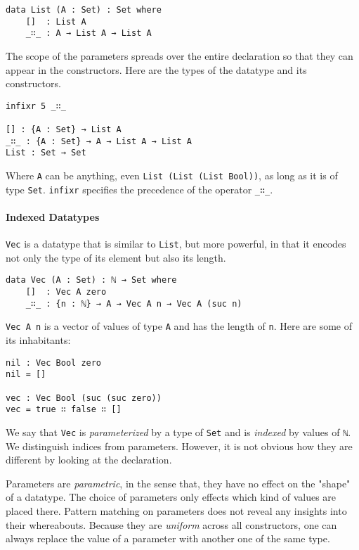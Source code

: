 \documentclass[../thesis.tex]{subfiles}
\begin{document}
\begin{lstlisting}
data List (A : Set) : Set where
    []  : List A
    _∷_ : A → List A → List A
\end{lstlisting}

The scope of the parameters spreads over the entire declaration so that they can
appear in the constructors.
Here are the types of the datatype and its constructors.

\begin{lstlisting}
infixr 5 _∷_

[] : {A : Set} → List A
_∷_ : {A : Set} → A → List A → List A
List : Set → Set
\end{lstlisting}

Where {\lstinline|A|} can be anything, even {\lstinline|List (List (List Bool))|},
as long as it is of type {\lstinline|Set|}. {\lstinline|infixr|} specifies the
precedence of the operator {\lstinline|_∷_|}.

\paragraph{Indexed Datatypes}



{\lstinline|Vec|} is a datatype that is similar to {\lstinline|List|}, but more
powerful, in that it encodes not only the type of its element but also its
length.

\begin{lstlisting}
data Vec (A : Set) : ℕ → Set where
    []  : Vec A zero
    _∷_ : {n : ℕ} → A → Vec A n → Vec A (suc n)
\end{lstlisting}

{\lstinline|Vec A n|} is a vector of values of type {\lstinline|A|} and
has the length of {\lstinline|n|}. Here are some of its inhabitants:

\begin{lstlisting}
nil : Vec Bool zero
nil = []

vec : Vec Bool (suc (suc zero))
vec = true ∷ false ∷ []
\end{lstlisting}

We say that {\lstinline|Vec|} is \textit{parameterized} by a type of {\lstinline|Set|}
and is \textit{indexed} by values of {\lstinline|ℕ|}.
We distinguish indices from parameters. However, it is not obvious how they are
different by looking at the declaration.

Parameters are \textit{parametric}, in the sense that, they have no effect on the "shape" of a datatype.
The choice of parameters only effects which kind of values are placed there.
Pattern matching on parameters does not reveal any insights into their whereabouts.
Because they are \textit{uniform} across all constructors, one can always replace
the value of a parameter with another one of the same type.
\end{document}
